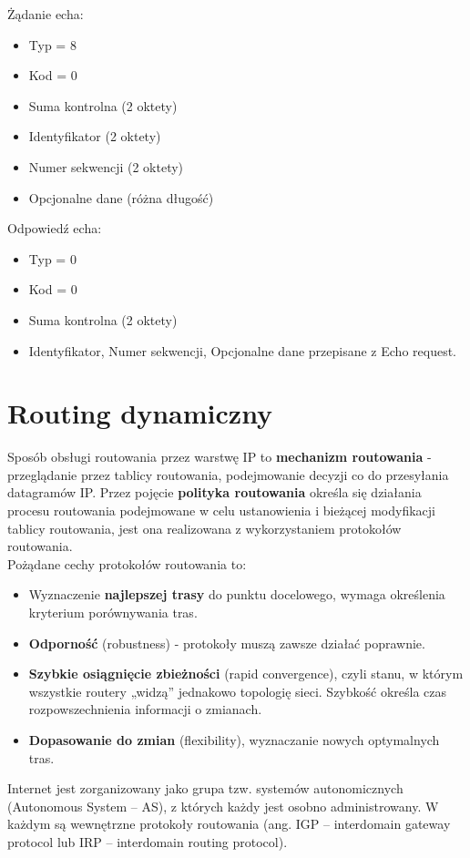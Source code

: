 \documentclass[a4paper]{article}
\begin{document}
Żądanie echa:
\begin{itemize}
    \item Typ = 8
    \item Kod = 0
    \item Suma kontrolna (2 oktety)
    \item Identyfikator (2 oktety)
    \item Numer sekwencji (2 oktety)
    \item Opcjonalne dane (różna długość)
\end{itemize}

Odpowiedź echa:
\begin{itemize}
    \item Typ = 0
    \item Kod = 0
    \item Suma kontrolna (2 oktety)
    \item Identyfikator, Numer sekwencji, Opcjonalne dane przepisane z Echo request.
\end{itemize}

\section{Routing dynamiczny}
Sposób obsługi routowania przez warstwę IP to \textbf{mechanizm routowania} -
przeglądanie przez tablicy routowania, podejmowanie decyzji co do przesyłania datagramów IP.
Przez pojęcie \textbf{polityka routowania} określa się działania procesu routowania podejmowane w
celu ustanowienia i bieżącej modyfikacji tablicy routowania, jest ona realizowana z wykorzystaniem protokołów routowania.\\

Pożądane cechy protokołów routowania to:
\begin{itemize}
    \item Wyznaczenie \textbf{najlepszej trasy} do punktu docelowego, wymaga określenia kryterium porównywania tras.
    \item \textbf{Odporność} (robustness) - protokoły muszą zawsze działać poprawnie.
    \item \textbf{Szybkie osiągnięcie zbieżności} (rapid convergence), czyli stanu, w którym wszystkie routery „widzą” jednakowo topologię sieci.
Szybkość określa czas rozpowszechnienia informacji o zmianach.
    \item \textbf{Dopasowanie do zmian} (flexibility), wyznaczanie nowych optymalnych tras.
\end{itemize}

Internet jest zorganizowany jako grupa tzw. systemów autonomicznych (Autonomous
System – AS), z których każdy jest osobno administrowany. W każdym są wewnętrzne protokoły routowania (ang. IGP – interdomain gateway protocol lub IRP – interdomain routing protocol).\\
\end{document}
